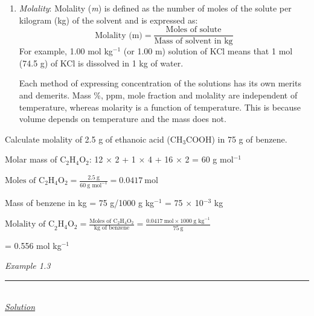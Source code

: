 \documentclass[11pt,a4paper]{article}
\begin{document}

\noindent\hfill\begin{minipage}[t]{0.765\textwidth}
\begin{enumerate}[label=(\roman*),leftmargin=24pt,topsep=0pt,start=7]
\item \textit{Molality}: Molality (\textit{m}) is defined as the number of moles of the solute per kilogram (kg) of the solvent and is expressed as:
\[ \text{Molality (m)} = \frac{\text{Moles of solute}}{\text{Mass of solvent in kg}} \tag{1.9} \]
For example, 1.00 mol kg$^{-1}$ (or 1.00 m) solution of KCl means that 1 mol (74.5 g) of KCl is dissolved in 1 kg of water.

Each method of expressing concentration of the solutions has its own merits and demerits. Mass \%, ppm, mole fraction and molality are independent of temperature, whereas molarity is a function of temperature. This is because volume depends on temperature and the mass does not.
\end{enumerate}
\end{minipage}

\vspace{10pt}
\begin{tcolorbox}[enhanced,colback=white,colframe=gray!40,boxrule=0.8pt,arc=2mm,left=8pt,right=24pt,top=4pt,bottom=6pt,boxsep=0pt,drop fuzzy shadow=gray!40,overlay={\fill[SkyBlue] ([xshift=-14pt]frame.south east) rectangle (frame.north east);}]
\noindent\begin{minipage}[t]{0.80\linewidth}
Calculate molality of 2.5 g of ethanoic acid (CH$_3$COOH) in 75 g of benzene.

\vspace{6pt}
Molar mass of C$_2$H$_4$O$_2$: 12 $\times$ 2 + 1 $\times$ 4 + 16 $\times$ 2 = 60 g mol$^{-1}$

\noindent$\displaystyle \text{Moles of C}_2\text{H}_4\text{O}_2 = \frac{2.5\ \text{g}}{60\ \text{g mol}^{-1}} = 0.0417\ \text{mol}$

\vspace{2pt}
Mass of benzene in kg = 75 g/1000 g kg$^{-1}$ = 75 $\times$ 10$^{-3}$ kg

\noindent$\displaystyle \text{Molality of C}_2\text{H}_4\text{O}_2 = \frac{\text{Moles of C}_2\text{H}_4\text{O}_2}{\text{kg of benzene}} = \frac{0.0417\ \text{mol} \times 1000\ \text{g kg}^{-1}}{75\ \text{g}}$

\hspace*{8.6em}= 0.556 mol kg$^{-1}$
\end{minipage}\hfill
\begin{minipage}[t]{0.17\linewidth}
{\color{DeepSkyBlue3}\large\itshape Example 1.3}\\[-3pt]
{\color{DeepSkyBlue3}\rule{\linewidth}{0.8pt}}\\[8pt]
{\color{DeepSkyBlue3}\large\itshape\underline{Solution}}
\end{minipage}
\end{tcolorbox}
\end{document}
